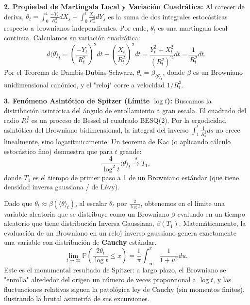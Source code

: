 \documentclass[11pt, letterpaper]{article}
\begin{document}
\begin{solucion}
    \textbf{2. Propiedad de Martingala Local y Variación Cuadrática:}
    Al carecer de deriva, $\theta_t = \int_0^t \frac{-Y_s}{R_s^2} dX_s + \int_0^t \frac{X_s}{R_s^2} dY_s$ es la suma de dos integrales estocásticas respecto a brownianos independientes. Por ende, $\theta_t$ es una martingala local continua.
    Calculamos su variación cuadrática:
    \[ d\langle \theta \rangle_t = \left(\frac{-Y_t}{R_t^2}\right)^2 dt + \left(\frac{X_t}{R_t^2}\right)^2 dt = \frac{Y_t^2 + X_t^2}{(R_t^2)^2} dt = \frac{1}{R_t^2} dt. \]
    Por el Teorema de Dambis-Dubins-Schwarz, $\theta_t = \beta_{\langle \theta \rangle_t}$, donde $\beta$ es un Browniano unidimensional canónico, y el "reloj" corre a velocidad $1/R_t^2$.

    \textbf{3. Fenómeno Asintótico de Spitzer (Límite $\log t$):}
    Buscamos la distribución asintótica del ángulo de enrollamiento a gran escala.
    El cuadrado del radio $R_t^2$ es un proceso de Bessel al cuadrado BESQ(2). Por la ergodicidad asintótica del Browniano bidimensional, la integral del inverso $\int_1^t \frac{1}{R_s^2} ds$ no crece linealmente, sino logarítmicamente.
    Un teorema de Kac (o aplicando cálculo estocástico fino) demuestra que para $t$ grande:
    \[ \frac{4}{\log^2 t} \langle \theta \rangle_t \xrightarrow{d} T_1, \]
    donde $T_1$ es el tiempo de primer paso a 1 de un Browniano estándar (que tiene densidad inversa gaussiana / de Lévy).
    
    Dado que $\theta_t \approx \beta( \langle \theta \rangle_t )$, al escalar $\theta_t$ por $\frac{2}{\log t}$, obtenemos en el límite una variable aleatoria que se distribuye como un Browniano $\beta$ evaluado en un tiempo aleatorio que tiene distribución Inversa Gaussiana, $\beta(T_1)$.
    Matemáticamente, la evaluación de un Browniano en un reloj inverso gaussiano genera exactamente una variable con distribución de \textbf{Cauchy} estándar.
    \[ \lim_{t \to \infty} \mathbb{P} \left( \frac{2 \theta_t}{\log t} \le x \right) = \frac{1}{\pi} \int_{-\infty}^x \frac{1}{1+u^2} du. \]
    Este es el monumental resultado de Spitzer: a largo plazo, el Browniano se "enrolla" alrededor del origen un número de veces proporcional a $\log t$, y las fluctuaciones relativas siguen la patológica ley de Cauchy (sin momentos finitos), ilustrando la brutal asimetría de sus excursiones.
\end{solucion}
\end{document}

